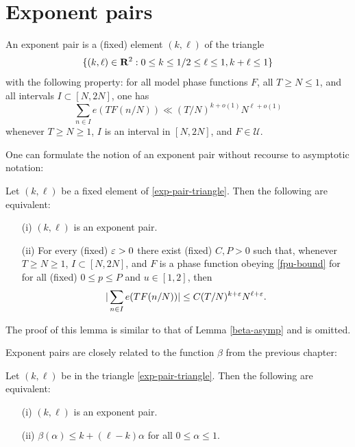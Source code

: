 \chapter{Exponent pairs}

\begin{definition}\label{exp-pair-def}  An exponent pair is a (fixed) element $(k,\ell)$ of the triangle
\begin{equation}\label{exp-pair-triangle}
    \{ (k,\ell) \in \mathbf{R}^2: 0 \leq k \leq 1/2 \leq \ell \leq 1, k+\ell \leq 1 \}
\end{equation}
with the following property: for all model phase functions $F$, all $T \geq N \leq 1$, and all intervals $I \subset [N,2N]$, one has
\begin{equation}\label{ntf}
 \sum_{n \in I} e(T F(n/N)) \ll (T/N)^{k+o(1)} N^{\ell+o(1)}
\end{equation}
whenever $T \geq N \geq 1$, $I$ is an interval in $[N,2N]$, and $F \in {\mathcal U}$.
\end{definition}


One can formulate the notion of an exponent pair without recourse to asymptotic notation:

\begin{lemma}  Let $(k,\ell)$ be a fixed element of \eqref{exp-pair-triangle}.  Then the following are equivalent:
    \begin{itemize}
    \item[(i)] $(k,\ell)$ is an exponent pair.
    \item[(ii)] For every (fixed) $\varepsilon>0$ there exist (fixed) $C, P > 0$ such that, whenever $T \geq N \geq 1$, $I \subset [N,2N]$, and $F$ is a phase function obeying \eqref{fpu-bound} for for all (fixed) $0 \leq p \leq P$ and $u \in [1,2]$, then
    $$ |\sum_{n \in I} e(T F(n/N))| \leq C (T/N)^{k+\varepsilon} N^{\ell+\varepsilon}.$$
   \end{itemize}
\end{lemma}

The proof of this lemma is similar to that of Lemma \ref{beta-asymp} and is omitted.

Exponent pairs are closely related to the function $\beta$ from the previous chapter:

\begin{lemma}\label{beta-duality}  Let $(k,\ell)$ be in the triangle \eqref{exp-pair-triangle}.  Then the following are equivalent:
    \begin{itemize}
    \item[(i)] $(k,\ell)$ is an exponent pair.
    \item[(ii)] $\beta(\alpha) \leq k + (\ell-k)\alpha$ for all $0 \leq \alpha \leq 1$.
    \end{itemize}
    \end{lemma}

